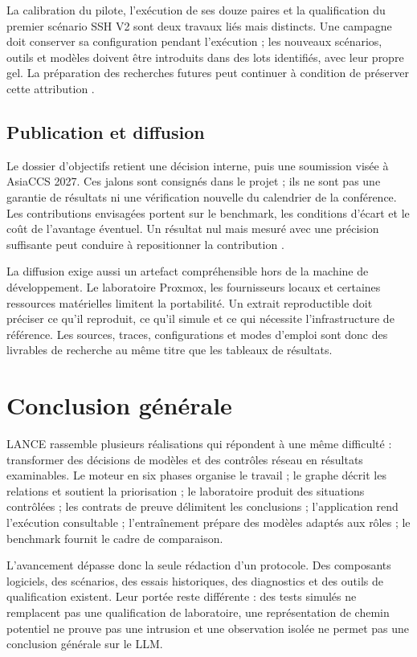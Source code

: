 \documentclass[11pt,a4paper]{article}
\begin{document}
La calibration du pilote, l'exécution de ses douze paires et la qualification du
premier scénario SSH V2 sont deux travaux liés mais distincts. Une campagne
doit conserver sa configuration pendant l'exécution ; les nouveaux scénarios,
outils et modèles doivent être introduits dans des lots identifiés, avec leur
propre gel. La préparation des recherches futures peut continuer à condition
de préserver cette attribution \cite{bench-pilote,bench-ssh}.

\subsection{Publication et diffusion}
Le dossier d'objectifs retient une décision interne, puis une soumission visée
à AsiaCCS 2027. Ces jalons sont consignés dans le projet ; ils ne sont pas une
garantie de résultats ni une vérification nouvelle du calendrier de la
conférence. Les contributions
envisagées portent sur le benchmark, les conditions d'écart et le coût de
l'avantage éventuel. Un résultat nul mais mesuré avec une précision suffisante
peut conduire à repositionner la contribution \cite{bench-objectif}.

La diffusion exige aussi un artefact compréhensible hors de la machine de
développement. Le laboratoire Proxmox, les fournisseurs locaux et certaines
ressources matérielles limitent la portabilité. Un extrait reproductible
doit préciser ce qu'il reproduit, ce qu'il simule et ce qui nécessite
l'infrastructure de référence. Les sources, traces, configurations et modes
d'emploi sont donc des livrables de recherche au même titre que les tableaux
de résultats.

\section{Conclusion générale}
LANCE rassemble plusieurs réalisations qui répondent à une même difficulté :
transformer des décisions de modèles et des contrôles réseau en résultats
examinables. Le moteur en six phases organise le travail ; le graphe décrit
les relations et soutient la priorisation ; le laboratoire produit des
situations contrôlées ; les contrats de preuve délimitent les conclusions ;
l'application rend l'exécution consultable ; l'entraînement prépare des
modèles adaptés aux rôles ; le benchmark fournit le cadre de comparaison.

L'avancement dépasse donc la seule rédaction d'un protocole. Des composants
logiciels, des scénarios, des essais historiques, des diagnostics et des outils
de qualification existent. Leur portée reste différente : des tests simulés
ne remplacent pas une qualification de laboratoire, une représentation de
chemin potentiel ne prouve pas une intrusion et une observation isolée ne
permet pas une conclusion générale sur le LLM.
\end{document}
